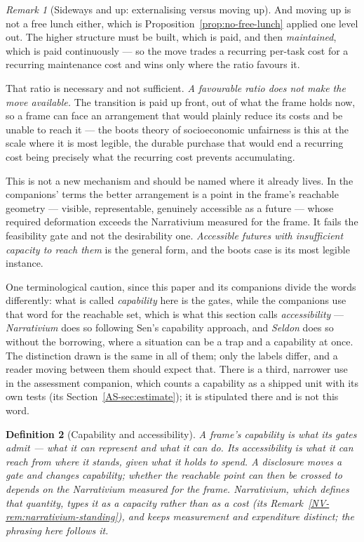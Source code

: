 \documentclass[11pt,a4paper]{article}
\newtheorem{definition}{Definition}[section]
\theoremstyle{remark}\newtheorem{remark}[definition]{Remark}
\begin{document}
\begin{remark}[Sideways and up: externalising versus moving up]
And moving up is not a free lunch either, which is Proposition~\ref{prop:no-free-lunch} applied one
level out. The higher structure must be built, which is paid, and then \emph{maintained}, which is paid
continuously --- so the move trades a recurring per-task cost for a recurring maintenance cost and wins
only where the ratio favours it.

That ratio is necessary and not sufficient.
\emph{A favourable ratio does not make the move available.} The transition is paid up front, out of what
the frame holds now, so a frame can face an arrangement that would plainly reduce its costs and be
unable to reach it --- the boots theory of socioeconomic unfairness is this at the scale where it is
most legible, the durable purchase that would end a recurring cost being precisely what the recurring
cost prevents accumulating.

This is not a new mechanism and should be named where it already lives. In the companions' terms the
better arrangement is a point in the frame's reachable geometry --- visible, representable, genuinely
accessible as a future --- whose required deformation exceeds the Narrativium measured for the frame. It fails
the feasibility gate and not the desirability one. \emph{Accessible futures with insufficient capacity
to reach them} is the general form, and the boots case is its most legible instance.

One terminological caution, since this paper and its companions divide the words differently: what is
called \emph{capability} here is the gates, while the companions use that word for the reachable set,
which is what this section calls \emph{accessibility} --- \emph{Narrativium} does so following Sen's capability approach,
and \emph{Seldon} does so without the borrowing, where a situation can be a trap and a capability at
once. The distinction drawn is the same in all of them; only the labels differ, and a reader moving
between them should expect that. There is a third, narrower use in the assessment companion, which counts a
capability as a shipped unit with its own tests (its Section~\ref{AS-sec:estimate}); it is stipulated
there and is not this word.
\end{remark}

\begin{definition}[Capability and accessibility]\label{def:capability}
A frame's \emph{capability} is what its gates admit --- what it can represent and what it can do. Its
\emph{accessibility} is what it can \emph{reach} from where it stands, given what it holds to spend. A
disclosure moves a gate and changes capability; whether the reachable point can then be crossed to
depends on the Narrativium measured for the frame. \emph{Narrativium}, which defines that quantity, types it as a
\emph{capacity} rather than as a cost (its Remark~\ref{NV-rem:narrativium-standing}), and keeps measurement and expenditure distinct; the phrasing
here follows it.
\end{definition}
\end{document}
